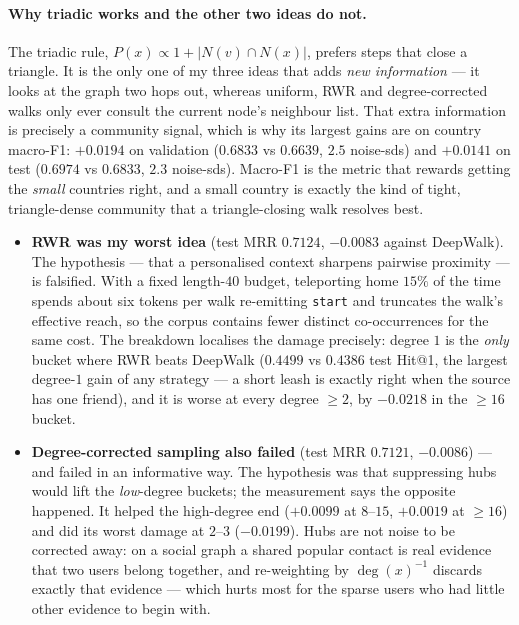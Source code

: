 \paragraph{Why triadic works and the other two ideas do not.}
The triadic rule, $P(x)\propto 1+|N(v)\cap N(x)|$, prefers steps that close a triangle.
It is the only one of my three ideas that adds \emph{new information} --- it looks at the
graph two hops out, whereas uniform, RWR and degree-corrected walks only ever consult the
current node's neighbour list.  That extra information is precisely a community signal,
which is why its largest gains are on country macro-F1: $+0.0194$ on validation ($0.6833$
vs $0.6639$, $2.5$ noise-sds) and $+0.0141$ on test ($0.6974$ vs $0.6833$, $2.3$
noise-sds).  Macro-F1 is the metric that rewards getting the \emph{small} countries right,
and a small country is exactly the kind of tight, triangle-dense community that a
triangle-closing walk resolves best.
\begin{itemize}[label=$\bullet$,itemsep=1pt]
\item \textbf{RWR was my worst idea} (test MRR $0.7124$, $-0.0083$ against DeepWalk).  The
hypothesis --- that a personalised context sharpens pairwise proximity --- is falsified.
With a fixed length-$40$ budget, teleporting home $15\%$ of the time spends about six
tokens per walk re-emitting \texttt{start} and truncates the walk's effective reach, so
the corpus contains fewer distinct co-occurrences for the same cost.  The breakdown
localises the damage precisely: degree $1$ is the \emph{only} bucket where RWR beats
DeepWalk ($0.4499$ vs $0.4386$ test Hit@1, the largest degree-$1$ gain of any strategy ---
a short leash is exactly right when the source has one friend), and it is worse at every
degree $\ge 2$, by $-0.0218$ in the $\ge 16$ bucket.
\item \textbf{Degree-corrected sampling also failed} (test MRR $0.7121$, $-0.0086$) --- and
failed in an informative way.  The hypothesis was that suppressing hubs would lift the
\emph{low}-degree buckets; the measurement says the opposite happened.  It helped the
high-degree end ($+0.0099$ at $8$--$15$, $+0.0019$ at $\ge 16$) and did its worst damage
at $2$--$3$ ($-0.0199$).  Hubs are not noise to be corrected away: on a social graph a
shared popular contact is real evidence that two users belong together, and re-weighting
by $\deg(x)^{-1}$ discards exactly that evidence --- which hurts most for the sparse users
who had little other evidence to begin with.
\end{itemize}

